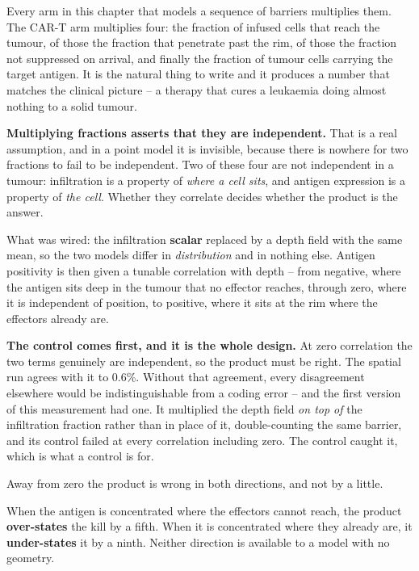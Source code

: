 \documentclass[11pt,twoside,openright]{report}
\begin{document}
Every arm in this chapter that models a sequence of barriers multiplies them. The CAR-T arm multiplies four: the fraction of infused cells that reach the tumour, of those the fraction that penetrate past the rim, of those the fraction not suppressed on arrival, and finally the fraction of tumour cells carrying the target antigen. It is the natural thing to write and it produces a number that matches the clinical picture -- a therapy that cures a leukaemia doing almost nothing to a solid tumour.

\textbf{Multiplying fractions asserts that they are independent.} That is a real assumption, and in a point model it is invisible, because there is nowhere for two fractions to fail to be independent. Two of these four are not independent in a tumour: infiltration is a property of \textit{where a cell sits}, and antigen expression is a property of \textit{the cell}. Whether they correlate decides whether the product is the answer.

\begin{numbers}
What was wired: the infiltration \textbf{scalar} replaced by a depth field with the same mean, so the two models differ in \textit{distribution} and in nothing else. Antigen positivity is then given a tunable correlation with depth -- from negative, where the antigen sits deep in the tumour that no effector reaches, through zero, where it is independent of position, to positive, where it sits at the rim where the effectors already are.
\end{numbers}

\textbf{The control comes first, and it is the whole design.} At zero correlation the two terms genuinely are independent, so the product must be right. The spatial run agrees with it to 0.6\%. Without that agreement, every disagreement elsewhere would be indistinguishable from a coding error -- and the first version of this measurement had one. It multiplied the depth field \textit{on top of} the infiltration fraction rather than in place of it, double-counting the same barrier, and its control failed at every correlation including zero. The control caught it, which is what a control is for.

\begin{finding}
Away from zero the product is wrong in both directions, and not by a little.







When the antigen is concentrated where the effectors cannot reach, the product \textbf{over-states} the kill by a fifth. When it is concentrated where they already are, it \textbf{under-states} it by a ninth. Neither direction is available to a model with no geometry.
\end{finding}
\end{document}
